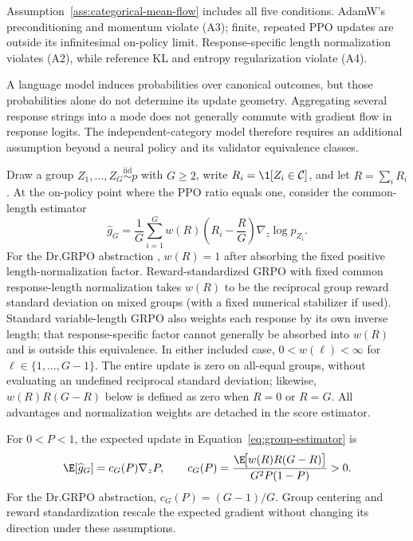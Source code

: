 Assumption~\ref{ass:categorical-mean-flow} includes all five conditions.
AdamW's preconditioning and momentum violate (A3); finite, repeated PPO
updates are outside its infinitesimal on-policy limit. Response-specific
length normalization violates (A2), while reference KL and entropy
regularization violate (A4).

A language model induces probabilities over canonical outcomes, but those
probabilities alone do not determine its update geometry. Aggregating several
response strings into a mode does not generally commute with gradient flow
in response logits. The independent-category model therefore requires an
additional assumption beyond a neural policy and its validator equivalence
classes.

Draw a group $Z_1,\ldots,Z_G\stackrel{\mathrm{iid}}{\sim}p$ with $G\ge2$,
write $R_i=\1[Z_i\in\mathcal C]$, and let $R=\sum_iR_i$. At the on-policy
point where the PPO ratio equals one, consider the common-length estimator
\begin{equation}
  \widehat g_G
  =\frac1G\sum_{i=1}^G
   w(R)\left(R_i-\frac{R}{G}\right)\nabla_z\log p_{Z_i}.
  \label{eq:group-estimator}
\end{equation}
For the Dr.GRPO abstraction \citep{liu2025understanding}, $w(R)=1$ after
absorbing the fixed positive length-normalization factor. Reward-standardized
GRPO \citep{shao2024deepseekmath} with fixed common response-length
normalization takes $w(R)$ to be the reciprocal group reward standard
deviation on mixed groups (with a fixed numerical stabilizer if used).
Standard variable-length GRPO also weights each response by its own inverse
length; that response-specific factor cannot generally be absorbed into
$w(R)$ and is outside this equivalence.
In either included case, $0<w(\ell)<\infty$ for
$\ell\in\{1,\ldots,G-1\}$. The entire update is zero on all-equal
groups, without evaluating an undefined reciprocal standard deviation;
likewise, $w(R)R(G-R)$ below is defined as zero when $R=0$ or $R=G$. All
advantages and normalization weights are detached in the score estimator.

\begin{lemma}
\enforcehalffinalproseline
\label{lem:grpo-mean}
For $0<P<1$, the expected update in Equation~\eqref{eq:group-estimator} is
\begin{equation}
  \E[\widehat g_G]
  =c_G(P)\nabla_z P,
  \qquad
  c_G(P)=
  \frac{\E\!\big[w(R)R(G-R)\big]}{G^2P(1-P)}>0.
  \label{eq:expected-group-gradient}
\end{equation}
For the Dr.GRPO abstraction, $c_G(P)=(G-1)/G$. Group centering and reward
standardization rescale the expected gradient without changing its direction
under these assumptions.
\end{lemma}

